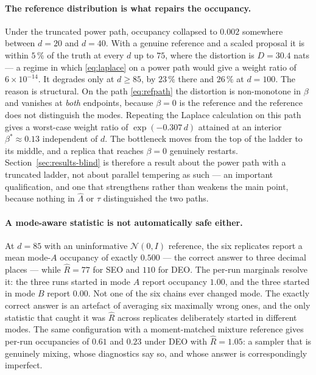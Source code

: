 \paragraph{The reference distribution is what repairs the occupancy.}
Under the truncated power path, occupancy collapsed to $0.002$ somewhere between
$d=20$ and $d=40$. With a genuine reference and a scaled proposal it is within
$5\,\%$ of the truth at every $d$ up to $75$, where the distortion is $D=30.4$
nats --- a regime in which \eqref{eq:laplace} on a power path would give a weight
ratio of $6\times10^{-14}$. It degrades only at $d\ge85$, by $23\,\%$ there and
$26\,\%$ at $d=100$. The reason is structural. On the path
\eqref{eq:refpath} the distortion is non-monotone in $\beta$ and vanishes at
\emph{both} endpoints, because $\beta=0$ is the reference and the reference does
not distinguish the modes. Repeating the Laplace calculation on this path gives a
worst-case weight ratio of $\exp(-0.307\,d)$ attained at an interior
$\beta^\ast\approx0.13$ independent of $d$. The bottleneck moves from the top of
the ladder to its middle, and a replica that reaches $\beta=0$ genuinely
restarts. Section~\ref{sec:results-blind} is therefore a result about the power
path with a truncated ladder, not about parallel tempering as such --- an
important qualification, and one that strengthens rather than weakens the main
point, because nothing in $\hat\Lambda$ or $\tau$ distinguished the two paths.

\paragraph{A mode-aware statistic is not automatically safe either.}
At $d=85$ with an uninformative $\mathcal N(0,I)$ reference, the six replicates
report a mean mode-$A$ occupancy of exactly $0.500$ --- the correct answer to
three decimal places --- while $\hat R=77$ for SEO and $110$ for DEO. The
per-run marginals resolve it: the three runs started in mode $A$ report occupancy
$1.00$, and the three started in mode $B$ report $0.00$. Not one of the six
chains ever changed mode. The exactly correct answer is an artefact of averaging
six maximally wrong ones, and the only statistic that caught it was $\hat R$
across replicates deliberately started in different modes. The same configuration
with a moment-matched mixture reference gives per-run occupancies of $0.61$ and
$0.23$ under DEO with $\hat R=1.05$: a sampler that is genuinely mixing, whose
diagnostics say so, and whose answer is correspondingly imperfect.

